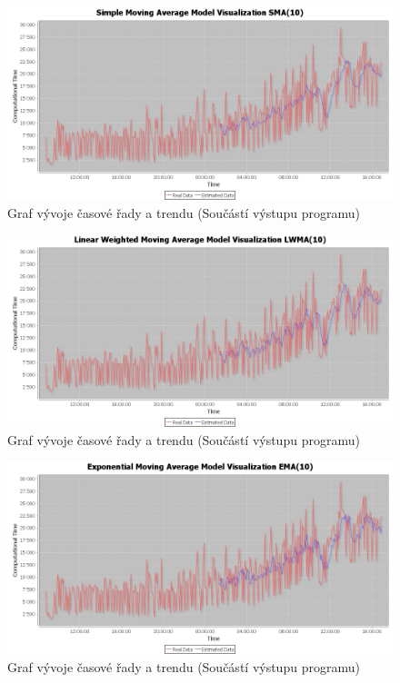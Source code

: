 \documentclass[a4paper,12pt,twoside]{scrreprt}
\begin{document}
\begin{figure}
  \centering
  \includegraphics[width=15cm]{pictures/grafy/SMA(10).jpeg}
  \caption{Graf vývoje časové řady a trendu \newline(Součástí výstupu programu)}
  \label{fig:regrese}
\end{figure}

\begin{figure}
  \centering
  \includegraphics[width=15cm]{pictures/grafy/LWMA(10).jpeg}
  \caption{Graf vývoje časové řady a trendu \newline(Součástí výstupu programu)}
  \label{fig:regrese}
\end{figure}

\begin{figure}[h]
  \centering
  \includegraphics[width=15cm]{pictures/grafy/EMA(10).jpeg}
  \caption{Graf vývoje časové řady a trendu \newline(Součástí výstupu programu)}
  \label{fig:regrese}
\end{figure}
\end{document}
